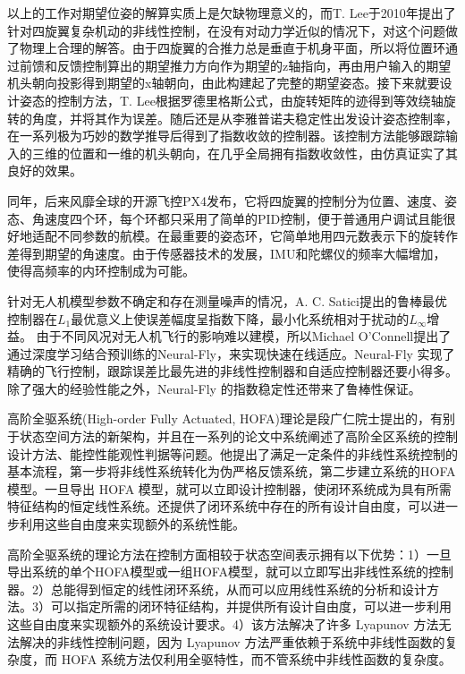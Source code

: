 以上的工作对期望位姿的解算实质上是欠缺物理意义的，而T. Lee于2010年提出了针对四旋翼复杂机动的非线性控制\cite{Lee2010}，在没有对动力学近似的情况下，对这个问题做了物理上合理的解答。由于四旋翼的合推力总是垂直于机身平面，所以将位置环通过前馈和反馈控制算出的期望推力方向作为期望的z轴指向，再由用户输入的期望机头朝向投影得到期望的x轴朝向，由此构建起了完整的期望姿态。接下来就要设计姿态的控制方法，T. Lee根据罗德里格斯公式，由旋转矩阵的迹得到等效绕轴旋转的角度，并将其作为误差。随后还是从李雅普诺夫稳定性出发设计姿态控制率，在一系列极为巧妙的数学推导后得到了指数收敛的控制器。该控制方法能够跟踪输入的三维的位置和一维的机头朝向，在几乎全局拥有指数收敛性，由仿真证实了其良好的效果。

同年，后来风靡全球的开源飞控PX4发布\cite{brescianini2013nonlinear}，它将四旋翼的控制分为位置、速度、姿态、角速度四个环，每个环都只采用了简单的PID控制，便于普通用户调试且能很好地适配不同参数的航模。在最重要的姿态环，它简单地用四元数表示下的旋转作差得到期望的角速度。由于传感器技术的发展，IMU和陀螺仪的频率大幅增加，使得高频率的内环控制成为可能。

针对无人机模型参数不确定和存在测量噪声的情况，A. C. Satici提出的鲁棒最优控制器在$L_1$最优意义上使误差幅度呈指数下降，最小化系统相对于扰动的$L_\infty$增益\cite{satici2013robust}。
由于不同风况对无人机飞行的影响难以建模，所以Michael O’Connell提出了通过深度学习结合预训练的Neural-Fly\cite{o2022neural}，来实现快速在线适应。Neural-Fly 实现了精确的飞行控制，跟踪误差比最先进的非线性控制器和自适应控制器还要小得多。除了强大的经验性能之外，Neural-Fly 的指数稳定性还带来了鲁棒性保证。


高阶全驱系统(High-order Fully Actuated, HOFA)理论是段广仁院士提出的，有别于状态空间方法的新架构\cite{duan1}\cite{duan2}\cite{duan3}\cite{duan4}\cite{duan5}，并且在一系列的论文中系统阐述了高阶全区系统的控制设计方法、能控性能观性判据等问题。他提出了满足一定条件的非线性系统控制的基本流程，第一步将非线性系统转化为伪严格反馈系统，第二步建立系统的HOFA模型。一旦导出 HOFA 模型，就可以立即设计控制器，使闭环系统成为具有所需特征结构的恒定线性系统。还提供了闭环系统中存在的所有设计自由度，可以进一步利用这些自由度来实现额外的系统性能。

高阶全驱系统的理论方法在控制方面相较于状态空间表示拥有以下优势：1）一旦导出系统的单个HOFA模型或一组HOFA模型，就可以立即写出非线性系统的控制器。2）总能得到恒定的线性闭环系统，从而可以应用线性系统的分析和设计方法。3）可以指定所需的闭环特征结构，并提供所有设计自由度，可以进一步利用这些自由度来实现额外的系统设计要求。4）该方法解决了许多 Lyapunov 方法无法解决的非线性控制问题，因为 Lyapunov 方法严重依赖于系统中非线性函数的复杂度，而 HOFA 系统方法仅利用全驱特性，而不管系统中非线性函数的复杂度。

